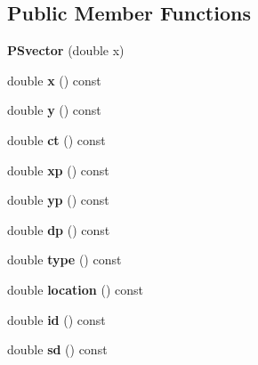 \subsection*{Public Member Functions}
\begin{DoxyCompactItemize}
\item 
\mbox{\label{classPSvector_abb03e1e715716a673a69d600266a30ff}} 
{\bfseries P\+Svector} (double x)
\item 
\mbox{\label{classPSvector_a5dd9fd651c1654d8d52cbb3995a6fbcb}} 
double {\bfseries x} () const
\item 
\mbox{\label{classPSvector_a3154ad3b411b9803f36dade8b7979a71}} 
double {\bfseries y} () const
\item 
\mbox{\label{classPSvector_a79b60b8dc7824b0e32a69812e4f5ca7a}} 
double {\bfseries ct} () const
\item 
\mbox{\label{classPSvector_a91eac14d8de93cf9df32b0ffed629f8b}} 
double {\bfseries xp} () const
\item 
\mbox{\label{classPSvector_aa1f1e48d622162f22deff5667e9a9846}} 
double {\bfseries yp} () const
\item 
\mbox{\label{classPSvector_adb94e16cafba3bd8dca0389ef3331155}} 
double {\bfseries dp} () const
\item 
\mbox{\label{classPSvector_a2de8a707f53f7391431290e22538ca2a}} 
double {\bfseries type} () const
\item 
\mbox{\label{classPSvector_afceeaffbfacd8c5e3f34cb1317753f24}} 
double {\bfseries location} () const
\item 
\mbox{\label{classPSvector_ab17416dd29468f5fb06631ff5cc18d3e}} 
double {\bfseries id} () const
\item 
\mbox{\label{classPSvector_aed24813f91ab65abf9c64c8a45f538d6}} 
double {\bfseries sd} () const
\item 
\mbox{\label{classPSvector_ae315fcc6cb8a4c10dd19187e5884c7d9}} 

\end{DoxyCompactItemize}
